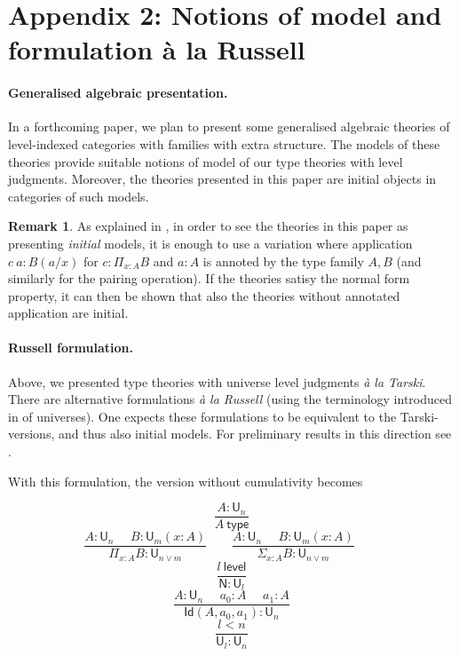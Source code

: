 \documentclass[11pt,a4paper]{article}
\theoremstyle{definition}
\newtheorem{remark}{Remark}
\newcommand{\Id}{\mathsf{Id}}
\newcommand{\NN}{\mathsf{N}}
\newcommand{\UU}{\mathsf{U}}
\newcommand{\Level}{\mathsf{level}}
\newcommand{\type}{\mathsf{type}}
\newcommand{\mypi}[3]{\Pi_{#1:#2}#3}
\newcommand{\mysig}[3]{\Sigma_{#1:#2}#3}
\begin{document}
\section*{Appendix 2: Notions of model and formulation \`a la Russell}

\paragraph{Generalised algebraic presentation.}

In a forthcoming paper, we plan to present some generalised algebraic theories of level-indexed categories with families with extra structure.  The models of these theories provide suitable notions of model of our type theories with level judgments. Moreover, the theories presented in this paper are initial objects in categories of such models.
\begin{remark} \label{app:annotation}
As explained
in \cite{streicher:semtt}, in order to see the theories in this paper as presenting {\em initial} models,
it is enough to use a variation where application $c~a:B(a/x)$ for $c:\mypi{x}{A}B$ and $a:A$
is annoted by the type family $A,B$ (and similarly for the pairing operation). If the theories satisy the normal form property, it can then be shown that also the theories without annotated application are initial.
\end{remark}

\paragraph{Russell formulation.}
Above, we presented type theories with universe level judgments {\em \`a la Tarski}. There are alternative formulations
{\em \`a la Russell} (using the terminology introduced in
\cite{martinlof:padova} of
universes). One expects these formulations to be equivalent to the Tarski-versions, and thus also initial models. For preliminary results in this
direction see \cite{Assaf14,Thire20}.

With this formulation, the version without cumulativity becomes

$$
\frac{A:\UU_{n}}{A~\type}
$$
$$
\frac{A:\UU_{n}~~~~~~B:\UU_m(x:A)}
     {\mypi{x}{A}{B}:\UU_{n\vee m}}~~~~~~~~~
\frac{A:\UU_{n}~~~~~~B:\UU_m(x:A)}
     {\mysig{x}{A}{B}:\UU_{n\vee m}}~~~~~~~~~
$$
$$\frac{l~\Level}{\NN:\UU_{l}}$$
$$
\frac{A:\UU_n~~~~~~a_0:A~~~~~~a_1:A}{\Id(A,a_0,a_1):\UU_n}
$$
$$
\frac{l<n}{{\UU_l}:\UU_{n}}
$$

\medskip
\end{document}
